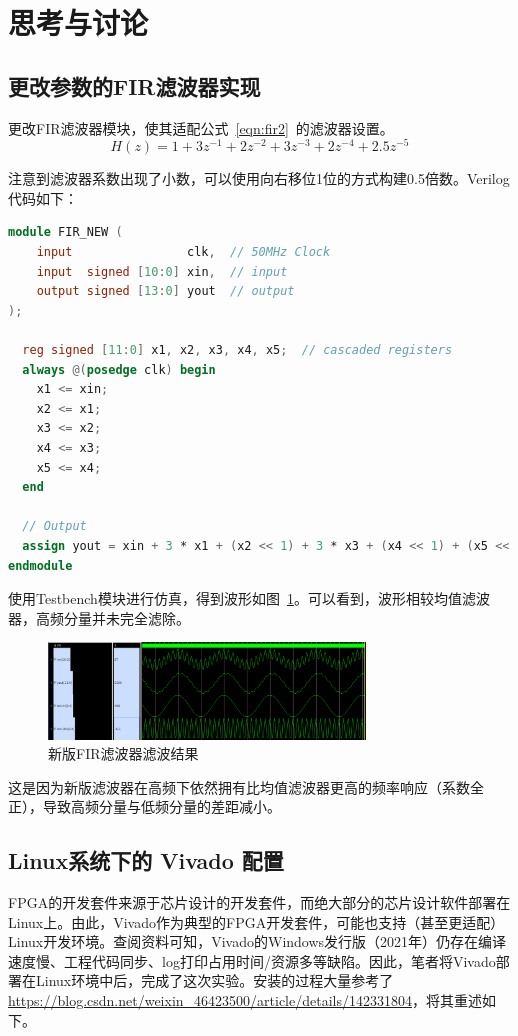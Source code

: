 \section{思考与讨论}
\subsection{更改参数的FIR滤波器实现}
更改FIR滤波器模块，使其适配公式~\ref{eqn:fir2}~的滤波器设置。
\begin{equation}\label{eqn:fir2}
  H(z) = 1 + 3z^{-1} + 2z^{-2} + 3z^{-3} + 2z^{-4} + 2.5z^{-5}
\end{equation}

注意到滤波器系数出现了小数，可以使用向右移位1位的方式构建0.5倍数。Verilog代码如下：
\begin{lstlisting}[language=verilog,caption={新版滤波器模块}]
module FIR_NEW (
    input                clk,  // 50MHz Clock
    input  signed [10:0] xin,  // input
    output signed [13:0] yout  // output
);

  reg signed [11:0] x1, x2, x3, x4, x5;  // cascaded registers
  always @(posedge clk) begin
    x1 <= xin;
    x2 <= x1;
    x3 <= x2;
    x4 <= x3;
    x5 <= x4;
  end

  // Output
  assign yout = xin + 3 * x1 + (x2 << 1) + 3 * x3 + (x4 << 1) + (x5 << 1) + (x5 >> 1);
endmodule

\end{lstlisting}

使用Testbench模块进行仿真，得到波形如图~\ref{fig:exp4:result2}。可以看到，波形相较均值滤波器，高频分量并未完全滤除。
\begin{figure}[htbp]
  \centering
  \includegraphics[width=0.75\textwidth]{figure/exp4/vivado_waveform_2.png}
  \caption{新版FIR滤波器滤波结果}
  \label{fig:exp4:result2}
\end{figure}

这是因为新版滤波器在高频下依然拥有比均值滤波器更高的频率响应（系数全正），导致高频分量与低频分量的差距减小。
\subsection{Linux系统下的 Vivado 配置}
FPGA的开发套件来源于芯片设计的开发套件，而绝大部分的芯片设计软件部署在Linux上。由此，Vivado作为典型的FPGA开发套件，可能也支持（甚至更适配）Linux开发环境。查阅资料可知，Vivado的Windows发行版（2021年）仍存在编译速度慢、工程代码同步、log打印占用时间/资源多等缺陷。因此，笔者将Vivado部署在Linux环境中后，完成了这次实验。安装的过程大量参考了\url{https://blog.csdn.net/weixin_46423500/article/details/142331804}，将其重述如下。

